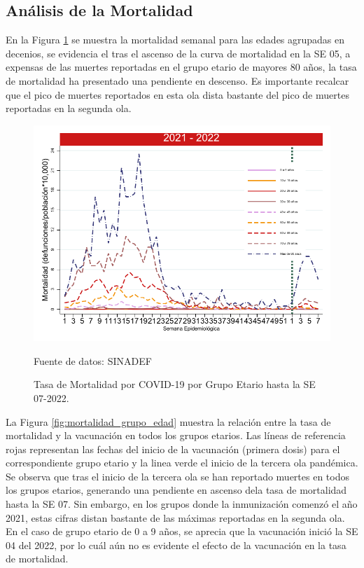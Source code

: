 \documentclass[12pt,a4paper,openany]{book}
\begin{document}
	\subsection*{Análisis de la Mortalidad}

\noindent En la Figura \ref{fig:mortalidad_edad} se muestra la mortalidad semanal para las edades agrupadas en decenios, se evidencia el tras el ascenso de la curva de mortalidad en la SE 05, a expensas de las muertes reportadas en el grupo etario de mayores 80 años, la tasa de mortalidad ha presentado una pendiente en descenso. Es importante recalcar que el pico de muertes reportados en esta ola dista bastante del pico de muertes reportadas en la segunda ola.  
	 	
\begin{figure}[h]
	\caption{Tasa de Mortalidad por COVID-19 por Grupo Etario hasta la SE 07-2022.}\label{fig:mortalidad_edad}
	\begin{center}
		\includegraphics[width=0.65\linewidth]{../figuras/mortalidad_edad_2021_2022.pdf}
	\end{center}
	{\footnotesize Fuente de datos: SINADEF} 
\end{figure}


La Figura \ref{fig:mortalidad_grupo_edad} muestra la relación entre la tasa de mortalidad y la vacunación en todos los grupos etarios. Las líneas de referencia rojas representan las fechas del inicio de la vacunación (primera dosis) para el correspondiente grupo etario y la linea verde el inicio de la tercera ola pandémica. Se observa que tras el inicio de la tercera ola se han reportado muertes en todos los grupos etarios, generando una pendiente en ascenso dela tasa de mortalidad hasta la SE 07. Sin embargo, en los grupos donde la inmunización comenzó el año 2021, estas cifras distan bastante de las máximas reportadas en la segunda ola. En el caso de grupo etario de 0 a 9 años, se aprecia que la vacunación inició la SE 04 del 2022, por lo cuál aún no es evidente el efecto de la vacunación en la tasa de mortalidad. 
\end{document}
